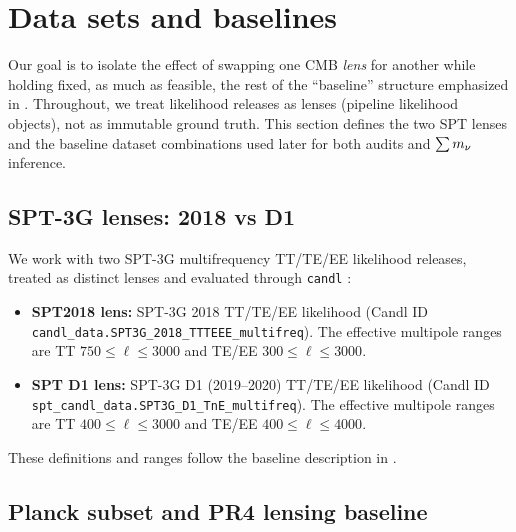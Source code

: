 \section{Data sets and baselines}
\label{sec:baselines}

Our goal is to isolate the effect of swapping one CMB \emph{lens} for another while holding fixed, as much as feasible, the rest of the ``baseline'' structure emphasized in \cite{arxiv2601_16277}. Throughout, we treat likelihood releases as lenses (pipeline likelihood objects), not as immutable ground truth. This section defines the two SPT lenses and the baseline dataset combinations used later for both audits and $\sum m_\nu$ inference.

\subsection{SPT-3G lenses: 2018 vs D1}
\label{sec:spt-lenses}

We work with two SPT-3G multifrequency TT/TE/EE likelihood releases, treated as distinct lenses and evaluated through \texttt{candl} \cite{candl}:
\begin{itemize}[leftmargin=*, itemsep=2pt]
  \item \textbf{SPT2018 lens:} SPT-3G 2018 TT/TE/EE likelihood \cite{spt3g2018_ttteee} (Candl ID \texttt{candl\_data.SPT3G\_2018\_TTTEEE\_multifreq}). The effective multipole ranges are TT $750\le \ell\le 3000$ and TE/EE $300\le \ell\le 3000$.
  \item \textbf{SPT D1 lens:} SPT-3G D1 (2019--2020) TT/TE/EE likelihood \cite{spt3g_d1} (Candl ID \texttt{spt\_candl\_data.SPT3G\_D1\_TnE\_multifreq}). The effective multipole ranges are TT $400\le \ell\le 3000$ and TE/EE $400\le \ell\le 4000$.
\end{itemize}
These definitions and ranges follow the baseline description in \cite{arxiv2601_16277}.

\subsection{Planck subset and PR4 lensing baseline}
\label{sec:planck-subset}

